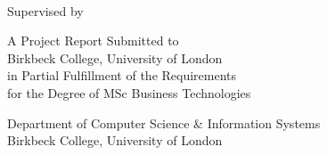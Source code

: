 \begin{center}

\thispagestyle{empty}
\null
\vfill

\LARGE
\textbf{\thetitle}
\large

\vspace{0.5in}

\textbf{\theauthor}\\
Supervised by \supervisor\\
\thedate

\vspace{0.5in}

A Project Report Submitted to\\
Birkbeck College, University of London\\
in Partial Fulfillment of the Requirements\\
for the Degree of MSc Business Technologies

\vspace{0.5in}

Department of Computer Science \& Information Systems\\
Birkbeck College, University of London

\vfill

\end{center}